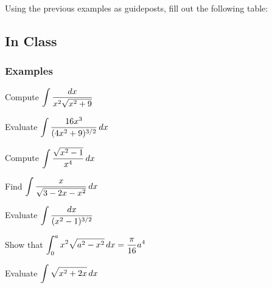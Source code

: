 \documentclass[notes]{subfiles}
\begin{document}
		\begin{question}
			Using the previous examples as guideposts, fill out the following table:
			\begin{center}
		\end{center}
		\end{question}
			\newpage
			
	\subsection*{In Class}
	\subsubsection*{Examples}
		\begin{ex}
			Compute $\displaystyle \int \dfrac{dx}{x^2\sqrt{x^2 + 9}}$
		\end{ex}
			
		\begin{ex}
			Evaluate $\displaystyle \int \dfrac{16x^3}{(4x^2+9)^{3/2}}\, dx$
		\end{ex}
			\newpage
			
		\begin{ex}
			Compute $\displaystyle \int \dfrac{\sqrt{x^2-1}}{x^4}\, dx$
		\end{ex}
			
		\begin{ex}
			Find $\displaystyle \int \dfrac{x}{\sqrt{3-2x-x^2}}\, dx$
		\end{ex}
			\newpage
			
		\begin{ex}
			Evaluate $\displaystyle \int \dfrac{dx}{(x^2-1)^{3/2}}$
		\end{ex}
			
		\begin{ex}
			Show that $\displaystyle \int_0^a x^2\sqrt{a^2-x^2}\, dx = \dfrac{\pi}{16}a^4$
		\end{ex}
			\newpage
			
		\begin{ex}
			Evaluate $\displaystyle \int \sqrt{x^2 + 2x}\, dx$
		\end{ex}
			
\end{document}
